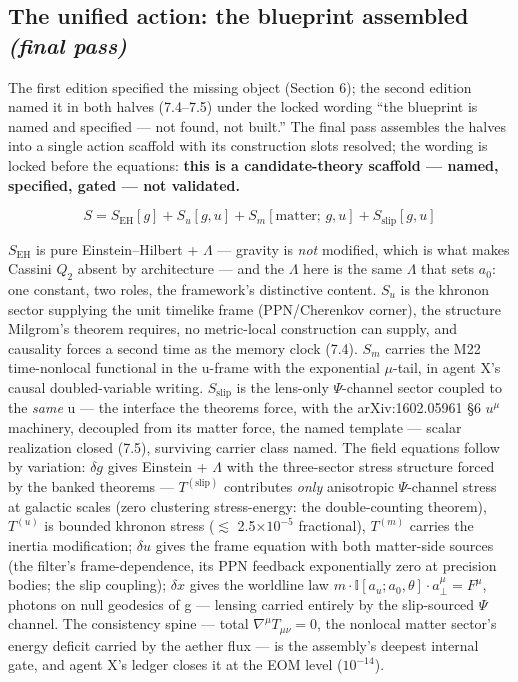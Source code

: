 \documentclass[11pt,a4paper]{article}
\begin{document}
\subsection{\texorpdfstring{The unified action: the blueprint assembled \emph{(final pass)}}{The unified action: the blueprint assembled (final pass)}}

The first edition specified the missing object (Section 6); the second edition named it in both halves (7.4--7.5) under the locked wording ``the blueprint is named and specified --- not found, not built.'' The final pass assembles the halves into a single action scaffold with its construction slots resolved; the wording is locked before the equations: \textbf{this is a candidate-theory scaffold --- named, specified, gated --- not validated.}

\begin{equation*}
S = S_{\mathrm{EH}}[g] + S_u[g, u] + S_m[\text{matter};\, g, u] + S_{\mathrm{slip}}[g, u]
\end{equation*}

$S_{\mathrm{EH}}$ is pure Einstein--Hilbert + $\Lambda$ --- gravity is \emph{not} modified, which is what makes Cassini $Q_2$ absent by architecture --- and the $\Lambda$ here is the same $\Lambda$ that sets $a_{0}$: one constant, two roles, the framework's distinctive content. $S_u$ is the khronon sector supplying the unit timelike frame (PPN/Cherenkov corner), the structure Milgrom's theorem requires, no metric-local construction can supply, and causality forces a second time as the memory clock (7.4). $S_m$ carries the M22 time-nonlocal functional in the u-frame with the exponential $\mu$-tail, in agent X's causal doubled-variable writing. $S_{\mathrm{slip}}$ is the lens-only $\Psi$-channel sector coupled to the \emph{same} u --- the interface the theorems force, with the arXiv:1602.05961 \S{}6 $u^\mu$ machinery, decoupled from its matter force, the named template --- scalar realization closed (7.5), surviving carrier class named. The field equations follow by variation: $\delta g$ gives Einstein + $\Lambda$ with the three-sector stress structure forced by the banked theorems --- $T^{(\mathrm{slip})}$ contributes \emph{only} anisotropic $\Psi$-channel stress at galactic scales (zero clustering stress-energy: the double-counting theorem), $T^{(u)}$ is bounded khronon stress ($\lesssim$ 2.5$\times10^{-5}$ fractional), $T^{(m)}$ carries the inertia modification; $\delta u$ gives the frame equation with both matter-side sources (the filter's frame-dependence, its PPN feedback exponentially zero at precision bodies; the slip coupling); $\delta x$ gives the worldline law $m\cdot\mathbb{I}[a_u; a_0, \theta]\cdot a_\perp^\mu = F^\mu$, photons on null geodesics of g --- lensing carried entirely by the slip-sourced $\Psi$ channel. The consistency spine --- total $\nabla^\mu T_{\mu\nu} = 0$, the nonlocal matter sector's energy deficit carried by the aether flux --- is the assembly's deepest internal gate, and agent X's ledger closes it at the EOM level ($10^{-14}$).
\end{document}

